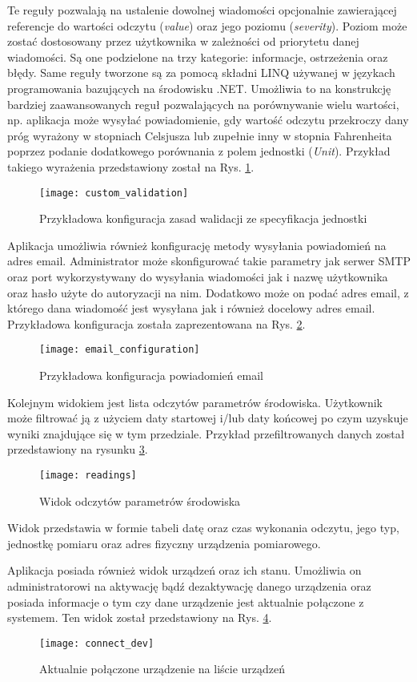 Te reguły pozwalają na ustalenie dowolnej wiadomości opcjonalnie zawierającej referencje
do wartości odczytu (\textit{value}) oraz jego poziomu (\textit{severity}). Poziom może zostać
dostosowany przez użytkownika w zależności od priorytetu danej wiadomości.
Są one podzielone na trzy kategorie: informacje, ostrzeżenia oraz błędy.
Same reguły tworzone są za pomocą składni LINQ używanej w językach programowania
bazujących na środowisku .NET. Umożliwia to na konstrukcję bardziej zaawansowanych reguł
pozwalających na porównywanie wielu wartości, np. aplikacja może wysyłać powiadomienie, gdy
wartość odczytu przekroczy dany próg wyrażony w stopniach Celsjusza lub zupełnie inny
w stopnia Fahrenheita poprzez podanie dodatkowego porównania z polem jednostki (\textit{Unit}).
Przykład takiego wyrażenia przedstawiony został na Rys. \ref{atmosphere:custom_validation}.
\begin{figure}[h!]
  \centering
  \texttt{[image: custom\_validation]}
  \caption{Przykładowa konfiguracja zasad walidacji ze specyfikacja jednostki}
  \label{atmosphere:custom_validation}
\end{figure}
Aplikacja umożliwia również konfigurację metody wysyłania powiadomień na adres email.
Administrator może skonfigurować takie parametry jak serwer SMTP oraz port wykorzystywany
do wysyłania wiadomości jak i nazwę użytkownika oraz hasło użyte do autoryzacji na nim.
Dodatkowo może on podać adres email, z którego dana wiadomość jest wysyłana jak i również
docelowy adres email. Przykładowa konfiguracja została zaprezentowana na Rys. \ref{atmosphere:email_configuration}.
\begin{figure}[h!]
  \centering
  \texttt{[image: email\_configuration]}
  \caption{Przykładowa konfiguracja powiadomień email}
  \label{atmosphere:email_configuration}
\end{figure}

Kolejnym widokiem jest lista odczytów parametrów środowiska. Użytkownik może 
filtrować ją z użyciem daty startowej i/lub daty końcowej po czym uzyskuje
wyniki znajdujące się w tym przedziale. Przykład przefiltrowanych danych
został przedstawiony na rysunku \ref{atmosphere:readings}.
\begin{figure}[h!]
  \centering
  \texttt{[image: readings]}
  \caption{Widok odczytów parametrów środowiska}
  \label{atmosphere:readings}
\end{figure}
Widok przedstawia w formie tabeli datę oraz czas wykonania odczytu, jego typ,
jednostkę pomiaru oraz adres fizyczny urządzenia pomiarowego.

Aplikacja posiada również widok urządzeń oraz ich stanu. Umożliwia on administratorowi
na aktywację bądź dezaktywację danego urządzenia oraz posiada informacje o tym czy 
dane urządzenie jest aktualnie połączone z systemem.
Ten widok został przedstawiony na Rys. \ref{device_list}.
\begin{figure}[h!]
  \centering
  \texttt{[image: connect\_dev]}
  \caption{Aktualnie połączone urządzenie na liście urządzeń}
  \label{device_list}
\end{figure}
